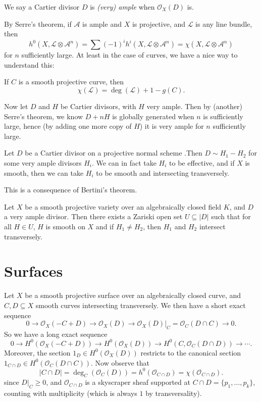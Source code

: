 \documentclass[a4paper]{article}
\begin{document}
\begin{defi}
  We say a Cartier divisor $D$ is \emph{(very) ample} when $\mathcal{O}_X(D)$ is.
\end{defi}
By Serre's theorem, if $\mathcal{A}$ is ample and $X$ is projective, and $\mathcal{L}$ is any line bundle, then
\[
  h^0(X, \mathcal{L} \otimes \mathcal{A}^n) = \sum (-1)^i h^i(X, \mathcal{L} \otimes \mathcal{A}^n) = \chi(X, \mathcal{L} \otimes \mathcal{A}^n)
\]
for $n$ sufficiently large. At least in the case of curves, we have a nice way to understand this:

\begin{thm}
  If $C$ is a smooth projective curve, then
  \[
    \chi(\mathcal{L}) = \deg(\mathcal{L}) + 1 - g(C).
  \]
\end{thm}

Now let $D$ and $H$ be Cartier divisors, with $H$ very ample. Then by (another) Serre's theorem, we know $D + nH$ is globally generated when $n$ is sufficiently large, hence (by adding one more copy of $H$) it is very ample for $n$ sufficiently large.

\begin{prop}
  Let $D$ be a Cartier divisor on a projective normal scheme .Then $D \sim H_1 - H_2$ for some very ample divisors $H_i$. We can in fact take $H_i$ to be effective, and if $X$ is smooth, then we can take $H_i$ to be smooth and intersecting transversely.
\end{prop}

This is a consequence of Bertini's theorem.
\begin{thm}[Bertini]
  Let $X$ be a smooth projective variety over an algebraically closed field $K$, and $D$ a very ample divisor. Then there exists a Zariski open set $U \subseteq |D|$ such that for all $H \in U$, $H$ is smooth on $X$ and if $H_1 \not= H_2$, then $H_1$ and $H_2$ intersect transversely.
\end{thm}

\section{Surfaces}
Let $X$ be a smooth projective surface over an algebraically closed curve, and $C, D \subseteq X$ smooth curves intersecting transversely. We then have a short exact sequence
\[
  0 \to \mathcal{O}_X(-C + D) \to \mathcal{O}_X(D) \to \mathcal{O}_X (D)|_{C} = \mathcal{O}_C(D \cap C) \to 0.
\]
So we have a long exact sequence
\[
  0 \to H^0(\mathcal{O}_X(-C + D)) \to H^0(\mathcal{O}_X(D)) \to H^0(C, \mathcal{O}_C(D \cap D)) \to \cdots.
\]
Moreover, the section $1_{D} \in H^0(\mathcal{O}_X(D))$ restricts to the canonical section $1_{C \cap D} \in H^0(\mathcal{O}_C(D \cap C))$. Now observe that
\[
  |C \cap D| = \deg_C(\mathcal{O}_C(D)) = h^0(\mathcal{O}_{C \cap D}) = \chi(\mathcal{O}_{C \cap D}).
\]
since $D|_C \geq 0$, and $\mathcal{O}_{C \cap D}$ is a skyscraper sheaf supported at $C \cap D = \{p_1, \ldots, p_k\}$, counting with multiplicity (which is always $1$ by transversality).
\end{document}
